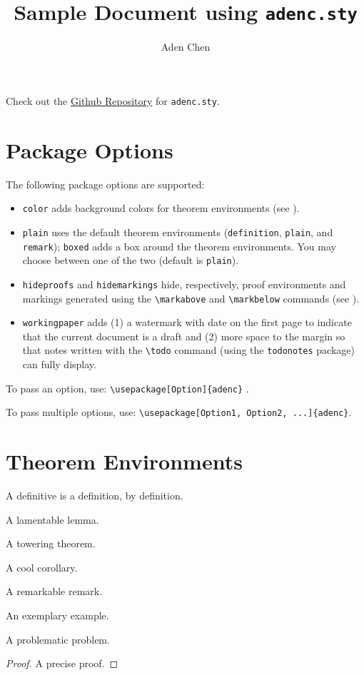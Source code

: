 \documentclass[12pt,oneside,letterpaper]{amsart}
\title{Sample Document using \texttt{adenc.sty}}
\author{Aden Chen}
\begin{document}
\maketitle
\tableofcontents

Check out the \href{https://github.com/AdenChen27/latex}{Github Repository} for \texttt{adenc.sty}. 

\section{Package Options}
The following package options are supported:
\begin{itemize}
  \item \verb|color| adds background colors for theorem environments (see ). 
  \item \verb|plain| uses the default theorem environments (\texttt{definition}, \texttt{plain}, and \texttt{remark}); \verb|boxed| adds a box around the theorem environments.
  You may choose between one of the two (default is \verb|plain|).
  \item \verb|hideproofs| and \verb|hidemarkings| hide, respectively, proof environments and markings generated using the \verb|\markabove| and \verb|\markbelow| commands (see ). 
  \item \verb|workingpaper| adds (1) a watermark with date on the first page to indicate that the current document is a draft and (2) more space to the margin so that notes written with the \verb|\todo| command (using the \verb|todonotes| package) can fully display. 
\end{itemize}

To pass an option, use: \verb|\usepackage[Option]{adenc}| . 

To pass multiple options, use: \verb|\usepackage[Option1, Option2, ...]{adenc}|. 


\section{Theorem Environments}
\label{sec:thm-env}

\begin{definition}
  A definitive  is a definition, by definition. 
\end{definition}
\begin{lemma}
  A lamentable lemma. 
\end{lemma}
\begin{theorem}
  A towering theorem. 
\end{theorem}
\begin{corollary}
  A cool corollary. 
\end{corollary}
\begin{remark}
  A remarkable remark. 
\end{remark}
\begin{example}
  An exemplary example. 
\end{example}
\begin{problem}
  A problematic problem. 
\end{problem}
\begin{proof}
  A precise proof.
\end{proof}
\end{document}
